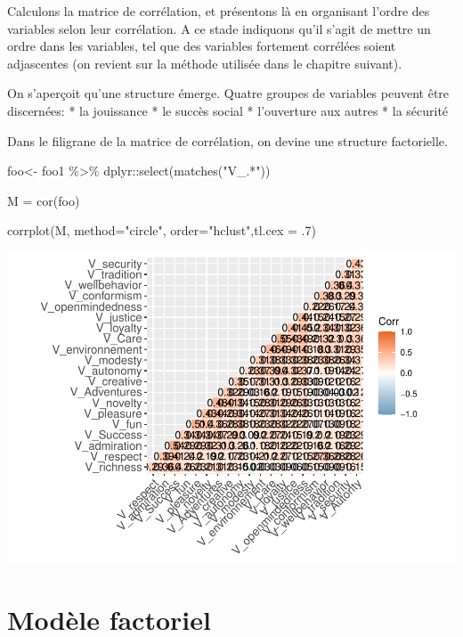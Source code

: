 \documentclass[
]{book}
\newenvironment{Shaded}{\begin{snugshade}}{\end{snugshade}}
\newcommand{\AttributeTok}[1]{\textcolor[rgb]{0.77,0.63,0.00}{#1}}
\newcommand{\DecValTok}[1]{\textcolor[rgb]{0.00,0.00,0.81}{#1}}
\newcommand{\FunctionTok}[1]{\textcolor[rgb]{0.00,0.00,0.00}{#1}}
\newcommand{\NormalTok}[1]{#1}
\newcommand{\OtherTok}[1]{\textcolor[rgb]{0.56,0.35,0.01}{#1}}
\newcommand{\SpecialCharTok}[1]{\textcolor[rgb]{0.00,0.00,0.00}{#1}}
\newcommand{\StringTok}[1]{\textcolor[rgb]{0.31,0.60,0.02}{#1}}
\begin{document}
Calculons la matrice de corrélation, et présentons là en organisant l'ordre des variables selon leur corrélation. A ce stade indiquons qu'il s'agit de mettre un ordre dans les variables, tel que des variables fortement corrélées soient adjascentes (on revient sur la méthode utilisée dans le chapitre suivant).

On s'aperçoit qu'une structure émerge. Quatre groupes de variables peuvent être discernées:
* la jouissance
* le succès social
* l'ouverture aux autres
* la sécurité

Dans le filigrane de la matrice de corrélation, on devine une structure factorielle.

\begin{Shaded}
\begin{Highlighting}[]
\NormalTok{foo}\OtherTok{\textless{}{-}}\NormalTok{ foo1 }\SpecialCharTok{\%\textgreater{}\%} 
\NormalTok{  dplyr}\SpecialCharTok{::}\FunctionTok{select}\NormalTok{(}\FunctionTok{matches}\NormalTok{(}\StringTok{"V\_.*"}\NormalTok{))}

\NormalTok{M }\OtherTok{=} \FunctionTok{cor}\NormalTok{(foo)}

\FunctionTok{corrplot}\NormalTok{(M, }\AttributeTok{method=}\StringTok{"circle"}\NormalTok{, }\AttributeTok{order=}\StringTok{"hclust"}\NormalTok{,}\AttributeTok{tl.cex =}\NormalTok{ .}\DecValTok{7}\NormalTok{)}
\end{Highlighting}
\end{Shaded}

\includegraphics{bookdown-demo_files/figure-latex/0603b-1.pdf}

\hypertarget{moduxe8le-factoriel}{%
\section{Modèle factoriel}\label{moduxe8le-factoriel}}
\end{document}
